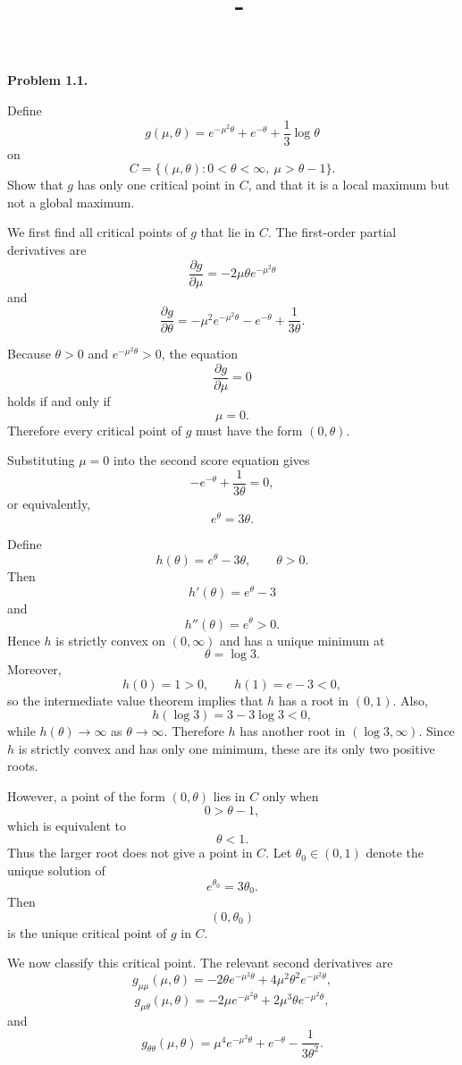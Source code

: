 \documentclass[answers,12pt,addpoints]{exam}
\author{\name}
\title{\course\ - \assignment}
\begin{document}
\maketitle

\begin{questions}

\question[0] \textbf{Problem 1.1.}

Define
\[
 g(\mu,\theta)=e^{-\mu^2\theta}+e^{-\theta}+\frac13\log\theta
\]
on
\[
 C=\{(\mu,\theta):0<\theta<\infty,\ \mu>\theta-1\}.
\]
Show that $g$ has only one critical point in $C$, and that it is a local maximum but
not a global maximum.

\begin{solution}
We first find all critical points of $g$ that lie in $C$.
The first-order partial derivatives are
\[
\frac{\partial g}{\partial\mu}
=
-2\mu\theta e^{-\mu^2\theta}
\]
and
\[
\frac{\partial g}{\partial\theta}
=
-\mu^2e^{-\mu^2\theta}
-e^{-\theta}
+\frac{1}{3\theta}.
\]

Because $\theta>0$ and $e^{-\mu^2\theta}>0$, the equation
\[
\frac{\partial g}{\partial\mu}=0
\]
holds if and only if
\[
\mu=0.
\]
Therefore every critical point of $g$ must have the form
$(0,\theta)$.

Substituting $\mu=0$ into the second score equation gives
\[
-e^{-\theta}+\frac{1}{3\theta}=0,
\]
or equivalently,
\[
e^\theta=3\theta.
\]

Define
\[
h(\theta)=e^\theta-3\theta,
\qquad \theta>0.
\]
Then
\[
h'(\theta)=e^\theta-3
\]
and
\[
h''(\theta)=e^\theta>0.
\]
Hence $h$ is strictly convex on $(0,\infty)$ and has a unique
minimum at
\[
\theta=\log 3.
\]
Moreover,
\[
h(0)=1>0,
\qquad
h(1)=e-3<0,
\]
so the intermediate value theorem implies that $h$ has a root
in $(0,1)$. Also,
\[
h(\log 3)=3-3\log 3<0,
\]
while $h(\theta)\to\infty$ as $\theta\to\infty$. Therefore $h$
has another root in $(\log 3,\infty)$. Since $h$ is strictly
convex and has only one minimum, these are its only two positive
roots.

However, a point of the form $(0,\theta)$ lies in $C$ only when
\[
0>\theta-1,
\]
which is equivalent to
\[
\theta<1.
\]
Thus the larger root does not give a point in $C$. Let
$\theta_0\in(0,1)$ denote the unique solution of
\[
e^{\theta_0}=3\theta_0.
\]
Then
\[
(0,\theta_0)
\]
is the unique critical point of $g$ in $C$.

We now classify this critical point. The relevant second
derivatives are
\[
g_{\mu\mu}(\mu,\theta)
=
-2\theta e^{-\mu^2\theta}
+
4\mu^2\theta^2e^{-\mu^2\theta},
\]
\[
g_{\mu\theta}(\mu,\theta)
=
-2\mu e^{-\mu^2\theta}
+
2\mu^3\theta e^{-\mu^2\theta},
\]
and
\[
g_{\theta\theta}(\mu,\theta)
=
\mu^4e^{-\mu^2\theta}
+
e^{-\theta}
-
\frac{1}{3\theta^2}.
\]


\end{solution}
\end{questions}
\end{document}
